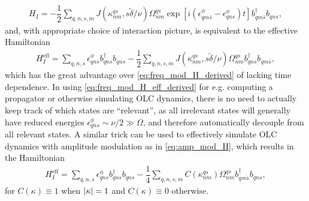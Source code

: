 \documentclass[aps,notitlepage,nofootinbib,11pt]{revtex4-1}
\renewcommand{\t}{\text} %
\newcommand{\f}[2]{\dfrac{#1}{#2}} %
\newcommand{\p}[1]{\left(#1\right)} %
\renewcommand{\sp}[1]{\left[#1\right]} %
\newcommand{\1}{\mathds{1}}
\begin{document}
\begin{align}
  H_I
  = -\f12\sum_{q,n,s,m}
  J\p{\kappa^{qs}_{nm},s\tilde\delta/\nu} \Omega^{qs}_{nm}
  \exp\sp{i\p{\epsilon_{qm\bar s}^\phi-\epsilon_{qns}^\phi}t}
  b_{qm\bar s}^\dag b_{qns},
\end{align}
and, with appropriate choice of interaction picture, is equivalent to
the effective Hamiltonian
\begin{align}
  H_I^{\t{eff}}
  = \sum_{q,n,s} \epsilon_{qns}^\phi b_{qns}^\dag b_{qns}
  - \f12\sum_{q,n,s,m} J\p{\kappa^{qs}_{nm},s\tilde\delta/\nu}
  \Omega^{qs}_{nm} b_{qns}^\dag b_{qm\bar s},
  \label{eq:freq_mod_H_eff_derived}
\end{align}
which has the great advantage over \eqref{eq:freq_mod_H_derived} of
lacking time dependence. In using \eqref{eq:freq_mod_H_eff_derived}
for e.g. computing a propagator or otherwise simulating OLC dynamics,
there is no need to actually keep track of which states are
``relevant'', as all irrelevant states will generally have reduced
energies $\epsilon_{qns}^\phi\sim\nu/2\gg\Omega$, and therefore
automatically decouple from all relevant states. A similar trick can
be used to effectively simulate OLC dynamics with amplitude modulation
as in \eqref{eq:amp_mod_H}, which results in the Hamiltonian
\begin{align}
  H_I^{\t{eff}}
  = \sum_{q,n,s} \epsilon_{qns}^\phi b_{qns}^\dag b_{qns}
  - \f14\sum_{q,n,s,m} C\p{\kappa^{qs}_{nm}} \Omega^{qs}_{nm}
  b_{qm\bar s}^\dag b_{qns},
\end{align}
for $C\p{\kappa}\equiv1$ when $\abs{\kappa}=1$ and
$C\p{\kappa}\equiv0$ otherwise.
\end{document}
